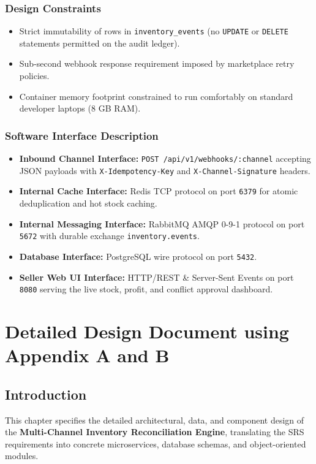 \documentclass[oneside,a4paper,12pt]{report}
\begin{document}
\subsection{Design Constraints}
\begin{itemize}
  \item Strict immutability of rows in \texttt{inventory\_events} (no \texttt{UPDATE} or \texttt{DELETE} statements permitted on the audit ledger).
  \item Sub-second webhook response requirement imposed by marketplace retry policies.
  \item Container memory footprint constrained to run comfortably on standard developer laptops (8 GB RAM).
\end{itemize}

\subsection{Software Interface Description}
\begin{itemize}
  \item \textbf{Inbound Channel Interface:} \texttt{POST /api/v1/webhooks/:channel} accepting JSON payloads with \texttt{X-Idempotency-Key} and \texttt{X-Channel-Signature} headers.
  \item \textbf{Internal Cache Interface:} Redis TCP protocol on port \texttt{6379} for atomic deduplication and hot stock caching.
  \item \textbf{Internal Messaging Interface:} RabbitMQ AMQP 0-9-1 protocol on port \texttt{5672} with durable exchange \texttt{inventory.events}.
  \item \textbf{Database Interface:} PostgreSQL wire protocol on port \texttt{5432}.
  \item \textbf{Seller Web UI Interface:} HTTP/REST \& Server-Sent Events on port \texttt{8080} serving the live stock, profit, and conflict approval dashboard.
\end{itemize}

\chapter{Detailed Design Document using Appendix A and B}

\section{Introduction}
This chapter specifies the detailed architectural, data, and component design of the \textbf{Multi-Channel Inventory Reconciliation Engine}, translating the SRS requirements into concrete microservices, database schemas, and object-oriented modules.
\end{document}
